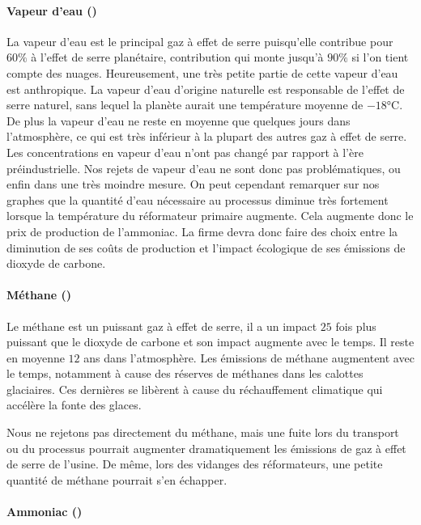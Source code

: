 \documentclass[a4paper, oneside, 12pt]{article}
\begin{document}
\paragraph{Vapeur d'eau ()}

La vapeur d’eau est le principal gaz à effet de serre 
puisqu’elle contribue pour $60\%$ à l’effet de serre planétaire, 
contribution qui monte jusqu’à $90\%$ si l’on tient compte des nuages. 
Heureusement, une très petite partie de cette vapeur d’eau est anthropique. 
La vapeur d’eau d’origine naturelle est responsable de l’effet de serre naturel, 
sans lequel la planète aurait une température moyenne de $-18\si{\degreeCelsius}$. 
De plus la vapeur d’eau ne reste en moyenne que quelques jours dans l’atmosphère, 
ce qui est très inférieur à la plupart des autres gaz à effet de serre. 
Les concentrations en vapeur d’eau n’ont pas changé par rapport à l’ère préindustrielle.
Nos rejets de vapeur d’eau ne sont donc pas problématiques,
ou enfin dans une très moindre mesure. 
On peut cependant remarquer sur nos graphes que la quantité d’eau nécessaire
au processus diminue très fortement lorsque la température du réformateur primaire augmente. 
Cela augmente donc le prix de production de l’ammoniac.
La firme devra donc faire des choix entre la diminution de ses coûts de production 
et l’impact écologique de ses émissions de dioxyde de carbone.

\paragraph{Méthane ()}

Le méthane est un puissant gaz à effet de serre,
il a un impact $25$ fois plus puissant que le dioxyde de carbone
et son impact augmente avec le temps. 
Il reste en moyenne $12$ ans dans l’atmosphère.
Les émissions de méthane augmentent avec le temps, 
notamment à cause des réserves de méthanes dans les calottes glaciaires. 
Ces dernières se libèrent à cause du réchauffement climatique qui accélère la fonte des glaces. 

Nous ne rejetons pas directement du méthane, mais une fuite lors du transport 
ou du processus pourrait augmenter dramatiquement les émissions de gaz à effet de serre de l’usine.  
De même, lors des vidanges des réformateurs, 
une petite quantité de méthane pourrait s’en échapper.

\paragraph{Ammoniac ()}
\end{document}
